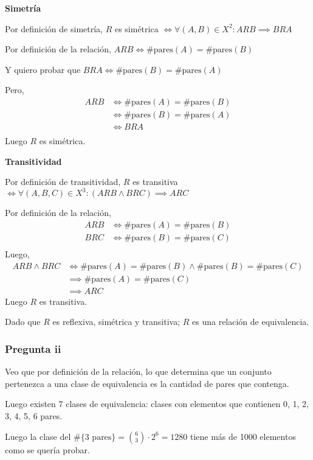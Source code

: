 \textbf{Simetría}

Por definición de simetría, $ R $ es simétrica $ \iff \forall (A,B) \in X^2: ARB \implies BRA $

Por definición de la relación, $ ARB \iff \#\text{pares}(A) = \#\text{pares}(B) $

Y quiero probar que $ BRA \iff \#\text{pares}(B) = \#\text{pares}(A) $

Pero,
\begin{align*}
    ARB &\iff \#\text{pares}(A) = \#\text{pares}(B) \\
    &\iff \#\text{pares}(B) = \#\text{pares}(A) \\
    &\iff BRA \\
\end{align*}
Luego $R$ es simétrica.

\textbf{Transitividad}

Por definición de transitividad, $ R $ es transitiva $ \iff \forall (A,B,C) \in X^3: (ARB \wedge BRC) \implies ARC $

Por definición de la relación, 
\begin{align*}
    ARB &\iff \#\text{pares}(A) = \#\text{pares}(B) \\
    BRC &\iff \#\text{pares}(B) = \#\text{pares}(C) \\
\end{align*}
Luego,
\begin{align*}
    ARB \wedge BRC &\iff \#\text{pares}(A) = \#\text{pares}(B) \wedge \#\text{pares}(B) = \#\text{pares}(C) \\
    &\implies \#\text{pares}(A) = \#\text{pares}(C) \\
    &\implies ARC
\end{align*}
Luego $R$ es transitiva.

Dado que $R$ es reflexiva, simétrica y transitiva; $R$ es una relación de equivalencia.

\subsubsection{Pregunta ii}

Veo que por definición de la relación, lo que determina que un conjunto pertenezca a una clase de equivalencia es la cantidad de pares que contenga.

Luego existen 7 clases de equivalencia: clases con elementos que contienen 0, 1, 2, 3, 4, 5, 6 pares.

Luego la clase del $ \#\{ \text{3 pares} \} = \binom{6}{3} \cdot 2^6 = 1280 $ tiene más de 1000 elementos como se quería probar.

